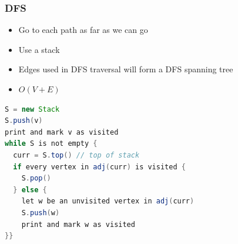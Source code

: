 \documentclass{article}
\begin{document}
\begin{multicols}{2}
\subsubsection{DFS}
\begin{itemize}
	\item Go to each path as far as we can go
	\item Use a stack
	\item Edges used in DFS traversal will form a DFS spanning tree
	\item $O(V+E)$
\end{itemize}
\begin{lstlisting}[language=Java]
S = new Stack
S.push(v)
print and mark v as visited
while S is not empty {
  curr = S.top() // top of stack
  if every vertex in adj(curr) is visited {
  	S.pop()
  } else {
    let w be an unvisited vertex in adj(curr)
    S.push(w)
    print and mark w as visited
}}
\end{lstlisting}


\end{multicols}
\end{document}
